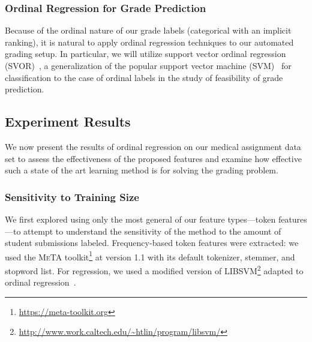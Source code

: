 \subsubsection{Ordinal Regression for Grade Prediction}

Because of the ordinal nature of our grade labels (categorical with an
implicit ranking), it is natural to apply ordinal regression techniques to
our automated grading setup. In particular, we will utilize support vector
ordinal regression (SVOR)~\cite{Chu:2007:SVOR}, a generalization of the
popular support vector machine (SVM)~\cite{Cortes:1995:SVM} for
classification to the case of ordinal labels in the study of feasibility of
grade prediction. 

\subsection{Experiment Results} 


We now present the results of ordinal regression on our medical assignment 
data set to assess the effectiveness of the proposed 
features and examine how effective such a state of the art learning method is for
solving the grading problem.  

\subsubsection{Sensitivity to Training Size}
We first explored using only the most general of our feature types---token
features---to attempt to understand the sensitivity of the method to the
amount of student submissions labeled. Frequency-based token features were
extracted: we used the \textsc{MeTA}
toolkit\footnote{\url{https://meta-toolkit.org}} at version 1.1
with its default tokenizer, stemmer, and stopword list. For regression, we
used a modified version of
\textsc{LIBSVM}\footnote{\url{http://www.work.caltech.edu/~htlin/program/libsvm/}}
adapted to ordinal regression~\cite{Li:2007:NIPS}.

